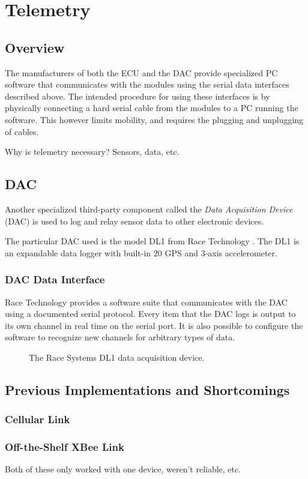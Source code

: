 \section{Telemetry}

\subsection{Overview}

The manufacturers of both the ECU and the DAC provide specialized PC software that communicates with the modules using the serial data interfaces described above. The intended procedure for using these interfaces is by physically connecting a hard serial cable from the modules to a PC running the software. This however limits mobility, and requires the plugging and unplugging of cables.

Why is telemetry necessary? Sensors, data, etc.

\subsection{DAC}

Another specialized third-party component called the \emph{Data Acquisition Device} (DAC) is used to log and relay sensor data to other electronic devices.

The particular DAC used is the model DL1 from Race Technology \cite{DL1Dsheet}. The DL1 is an expandable data logger with built-in \unit{20}{\hertz} GPS and 3-axis accelerometer.

\subsubsection{DAC Data Interface\label{sec:background_dac_data_interface}}

Race Technology provides a software suite that communicates with the DAC using a documented serial protocol. Every item that the DAC logs is output to its own channel in real time on the serial port. It is also possible to configure the software to recognize new channels for arbitrary types of data.

\begin{figure}[H]
\centering
\caption{The Race Systems DL1 data acquisition device.}
\label{fig:dl1_product}
\end{figure}

\subsection{Previous Implementations and Shortcomings}

\subsubsection{Cellular Link}


\subsubsection{Off-the-Shelf XBee Link}

Both of these only worked with one device, weren't reliable, etc.

